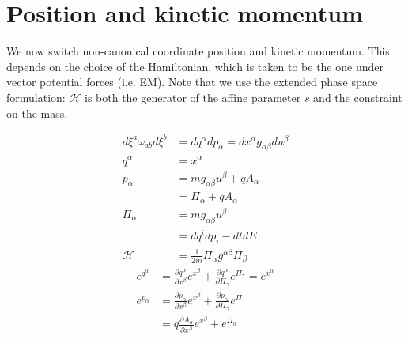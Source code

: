 \documentclass[11pt]{article}
\begin{document}
\section{Position and kinetic momentum}

We now switch non-canonical coordinate position and kinetic momentum. This depends on the choice of the Hamiltonian, which is taken to be the one under vector potential forces (i.e. EM). Note that we use the extended phase space formulation: $\mathcal{H}$ is both the generator of the affine parameter $s$ and the constraint on the mass.

\begin{equation}
\begin{aligned}
	d\xi^a \omega_{ab} d\xi^b &= dq^\alpha dp_\alpha = dx^\alpha g_{\alpha\beta} du^\beta \\
	q^\alpha &= x^\alpha \\
	p_\alpha &= m g_{\alpha \beta} u^\beta + q A_\alpha \\
	&= \Pi_\alpha + q A_\alpha \\
	\Pi_\alpha &= m g_{\alpha \beta} u^\beta \\
	&= dq^i dp_i - dt dE \\
	\mathcal{H} &= \frac{1}{2m} \Pi_\alpha g^{\alpha\beta} \Pi_\beta 
\end{aligned}
\end{equation}
\begin{equation}
\begin{aligned}
	e^{q^\alpha} &= \frac{\partial q^\alpha}{\partial x^\beta}e^{x^\beta} + \frac{\partial q^\alpha}{\partial \Pi_\gamma}e^{\Pi_\gamma} = e^{x^\alpha} \\
	e^{p_\alpha} &= \frac{\partial p_\alpha}{\partial x^\beta}e^{x^\beta} + \frac{\partial p_\alpha}{\partial \Pi_\gamma}e^{\Pi_\gamma} \\
	&= q \frac{\partial A_\alpha}{\partial x^\beta} e^{x^\beta} +e^{\Pi_\alpha} \\
\end{aligned}
\end{equation}
\end{document}
